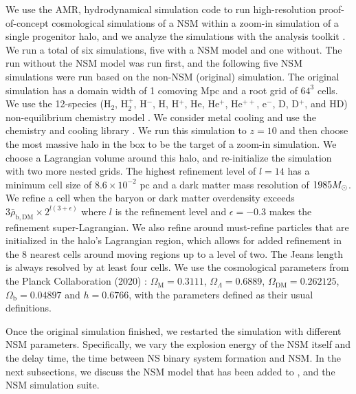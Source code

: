 \documentclass[fleqn,usenatbib]{mnras}
\begin{document}
We use the AMR, hydrodynamical simulation code \enzo{} \citep{Enzo} to run high-resolution proof-of-concept cosmological simulations of a NSM within a zoom-in simulation of a single progenitor halo, and we analyze the simulations with the analysis toolkit \yt{} \citep{yt_full_paper}. We run a total of six simulations, five with a NSM model and one without. The run without the NSM model was run first, and the following five NSM simulations were run based on the non-NSM (original) simulation. The original simulation has a domain width of 1 comoving Mpc and a root grid of $64^{3}$ cells. We use the 12-species (H$_{2}$, H$_{2}^{+}$, H$^{-}$, H, H$^{+}$, He, He$^{+}$, He$^{++}$, e$^{-}$, D, D$^{+}$, and HD) non-equilibrium chemistry model \citep{Abel97, Anninos97}. We consider metal cooling and use the chemistry and cooling library \grackle{} \citep{grackle}. We run this simulation to $z = 10$ and then choose the most massive halo in the box to be the target of a zoom-in simulation. We choose a Lagrangian volume around this halo, and re-initialize the simulation with two more nested grids. The highest refinement level of $l = 14$ has a minimum cell size of $8.6 \times 10^{-2}$ pc and a dark matter mass resolution of $1985 \Ms$. We refine a cell when the baryon or dark matter overdensity exceeds $3 \bar{\rho}_{\mathrm{b, DM}} \times 2^{l (3 + \epsilon)}$ where $l$ is the refinement level and $\epsilon = -0.3$ makes the refinement super-Lagrangian. We also refine around must-refine particles that are initialized in the halo's Lagrangian region, which allows for added refinement in the 8 nearest cells around moving regions up to a level of two. The Jeans length is always resolved by at least four cells. We use the cosmological parameters from the Planck Collaboration (2020) \citep{Planck18_Cosmo}: $\Omega_{\mathrm{M}} = 0.3111$, $\Omega_{\Lambda} = 0.6889$, $\Omega_{\mathrm{DM}} = 0.262125$, $\Omega_{\mathrm{b}} = 0.04897$ and $h = 0.6766$, with the parameters defined as their usual definitions.

Once the original simulation finished, we restarted the simulation with different NSM parameters. Specifically, we vary the explosion energy of the NSM itself and the delay time, the time between NS binary system formation and NSM. In the next subsections, we discuss the NSM model that has been added to \enzo{}, and the NSM simulation suite.
\end{document}
